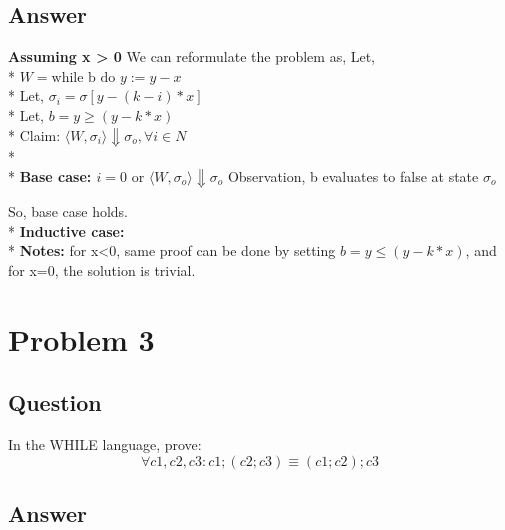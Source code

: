 \documentclass[a4paper, 11pt]{article}
\begin{document}
\subsection{Answer}

\textbf{Assuming x > 0}
We can reformulate the problem as,
Let,
\\* $W = \textrm{while b do }y := y-x$ 
\\* Let, $\sigma_i = \sigma[y - (k-i)*x]$
\\* Let, $b = y \ge (y - k*x)$
\\* Claim: $ \langle W, \sigma_i \rangle \Downarrow \sigma_o, \forall i \in N $
\\* \\*
\textbf{Base case: $i = 0 \textrm{ or }  \langle W, \sigma_o \rangle \Downarrow \sigma_o $}
Observation, b evaluates to false at state $\sigma_o$
\begin{prooftree}

  
\end{prooftree} 
So, base case holds.
\\*
\textbf{Inductive case:}
\\*
\textbf{Notes:}
for x<0, same proof can be done by setting $b = y \le (y - k*x)$, and for x=0, the solution is trivial.
\section{Problem 3}

\subsection{Question}
In the WHILE language, prove:
$$\forall c1, c2, c3 : c1; (c2; c3) \equiv (c1; c2); c3$$

\subsection{Answer}
\end{document}
